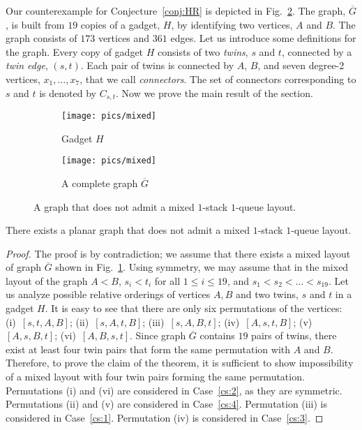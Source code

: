 \documentclass[orivec]{llncs}
\newcommand{\df}[1]{{\it #1}}
\newcommand{\Gc}{{\ensuremath{\overline{G}}}}
\newcounter{dummycount}
\newenvironment{backInTimeThm}[1]{
    \setcounter{dummycount}{\value{theorem}}
    \setcounter{theorem}{\value{#1}}}
{\setcounter{theorem}{\value{dummycount}}}
\begin{document}
Our counterexample for Conjecture~\ref{conj:HR} is depicted in Fig.~\ref{fig:mixed}. The graph, $\Gc$,
is built from $19$ copies of a gadget, $H$, by identifying two vertices, $A$ and $B$.
The graph consists of $173$ vertices and $361$ edges.
Let us introduce some definitions for the graph.
Every copy of gadget $H$ consists of two \df{twins}, $s$ and $t$, connected by a \df{twin
edge}, $(s, t)$. Each pair of twins is connected by $A$, $B$, and seven degree-2 vertices, $x_1, \dots, x_7$, that we call
\df{connectors}. The set of connectors corresponding to $s$ and $t$ is denoted by $C_{s,t}$.
Now we prove the main result of the section.

\begin{figure}[t]
    \centering
    \begin{subfigure}[b]{.4\linewidth}
        \texttt{[image: pics/mixed]}
        \caption{Gadget $H$}       
    \end{subfigure}
    \hfill
    \begin{subfigure}[b]{.4\linewidth}
        \texttt{[image: pics/mixed]}
        \caption{A complete graph $\Gc$}
        \label{fig:ce}
    \end{subfigure}
    \caption{A graph that does not admit a mixed $1$-stack $1$-queue layout.}
    \label{fig:mixed}
\end{figure}

\begin{backInTimeThm}{thm-ce}
    \begin{theorem}
        There exists a planar graph that does not admit a mixed $1$-stack $1$-queue layout.
    \end{theorem}
\end{backInTimeThm}

\begin{proof}
    The proof is by contradiction; we assume that there exists a mixed layout of graph $\Gc$ shown in Fig.~\ref{fig:ce}.
    Using symmetry, we may assume that in the mixed layout of the graph $A < B$, $s_i < t_i$ for all $1 \le i \le 19$, 
    and $s_1 < s_2 < \dots < s_{19}$. Let us analyze possible relative orderings of vertices $A, B$ and 
    two twins, $s$ and $t$ in a gadget $H$. It is easy to see that there are only six permutations of the vertices:
    (i)~$[s, t, A, B]$; (ii)~$[s, A, t, B]$; (iii)~$[s, A, B, t]$; (iv)~$[A, s, t, B]$; (v)~$[A, s, B, t]$; (vi)~$[A, B, s, t]$.
    Since graph $\Gc$ contains $19$ pairs of twins, there exist at least four twin pairs that
    form the same permutation with $A$ and $B$.
    Therefore, to prove the claim of the theorem, it is sufficient to show impossibility of a mixed layout
    with four twin pairs forming the same permutation. 
    Permutations (i) and (vi) are considered in Case~\ref{cs:2}, as they are symmetric.
    Permutations (ii) and (v) are considered in Case~\ref{cs:4}. 
    Permutation (iii) is considered in Case~\ref{cs:1}. 
    Permutation (iv) is considered in Case~\ref{cs:3}. 
\end{proof}
\end{document}

